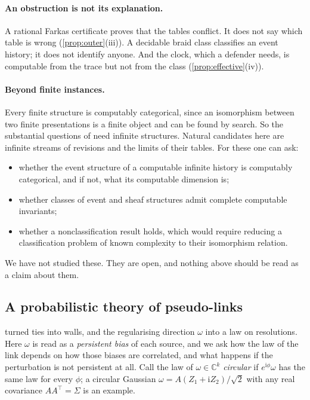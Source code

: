 \documentclass[11pt]{article}
\theoremstyle{definition}\newtheorem{definition}[theorem]{Definition}\newtheorem{remark}[theorem]{Remark}\newtheorem{example}[theorem]{Example}\newtheorem{problem}[theorem]{Open problem}\crefname{problem}{Problem}{Problems}
\begin{document}
\paragraph{An obstruction is not its explanation.} A rational Farkas certificate proves that the tables conflict. It does not say which table is wrong (\cref{prop:outer}(iii)). A decidable braid class classifies an event history; it does not identify anyone. And the clock, which a defender needs, is computable from the trace but not from the class (\cref{prop:effective}(iv)).

\paragraph{Beyond finite instances.} Every finite structure is computably categorical, since an isomorphism between two finite presentations is a finite object and can be found by search. So the substantial questions of \cite{DowneyMelnikov2025} need infinite structures. Natural candidates here are infinite streams of revisions and the limits of their tables. For these one can ask:
\begin{itemize}
\item whether the event structure of a computable infinite history is computably categorical, and if not, what its computable dimension is;
\item whether classes of event and sheaf structures admit complete computable invariants;
\item whether a nonclassification result holds, which would require reducing a classification problem of known complexity to their isomorphism relation.
\end{itemize}
We have not studied these. They are open, and nothing above should be read as a claim about them.

\subsection{A probabilistic theory of pseudo-links}\label{sec:pseudoprob}
 turned ties into walls, and the regularising direction $\omega$ into a law on resolutions. Here $\omega$ is read as a \emph{persistent bias} of each source, and we ask how the law of the link depends on how those biases are correlated, and what happens if the perturbation is not persistent at all. Call the law of $\omega\in\mathbb C^k$ \emph{circular} if $e^{\mathrm i\phi}\omega$ has the same law for every $\phi$; a circular Gaussian $\omega=A(Z_1+\mathrm iZ_2)/\sqrt2$ with any real covariance $AA^\top=\Sigma$ is an example.
\end{document}
